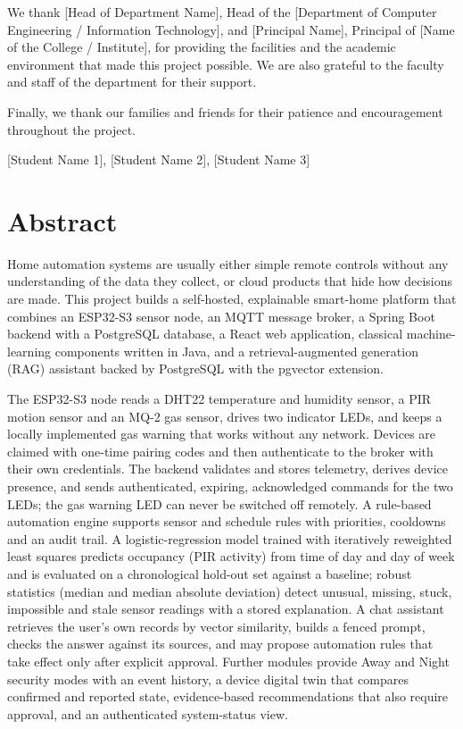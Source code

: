 \documentclass[12pt,a4paper,oneside]{report}
\newcommand{\StudentOne}{[Student Name 1]}
\newcommand{\StudentTwo}{[Student Name 2]}
\newcommand{\StudentThree}{[Student Name 3]}
\newcommand{\HODName}{[Head of Department Name]}
\newcommand{\PrincipalName}{[Principal Name]}
\newcommand{\Department}{[Department of Computer Engineering / Information Technology]}
\newcommand{\College}{[Name of the College / Institute]}
\begin{document}
We thank \HODName, Head of the \Department, and \PrincipalName, Principal of \College, for providing the facilities and the academic environment that made this project possible. We are also grateful to the faculty and staff of the department for their support.

Finally, we thank our families and friends for their patience and encouragement throughout the project.

\vspace{1.2cm}
\hfill \StudentOne, \StudentTwo, \StudentThree

\chapter*{Abstract}
Home automation systems are usually either simple remote controls without any understanding of the data they collect, or cloud products that hide how decisions are made. This project builds a self-hosted, explainable smart-home platform that combines an ESP32-S3 sensor node, an MQTT message broker, a Spring Boot backend with a PostgreSQL database, a React web application, classical machine-learning components written in Java, and a retrieval-augmented generation (RAG) assistant backed by PostgreSQL with the pgvector extension.

The ESP32-S3 node reads a DHT22 temperature and humidity sensor, a PIR motion sensor and an MQ-2 gas sensor, drives two indicator LEDs, and keeps a locally implemented gas warning that works without any network. Devices are claimed with one-time pairing codes and then authenticate to the broker with their own credentials. The backend validates and stores telemetry, derives device presence, and sends authenticated, expiring, acknowledged commands for the two LEDs; the gas warning LED can never be switched off remotely. A rule-based automation engine supports sensor and schedule rules with priorities, cooldowns and an audit trail. A logistic-regression model trained with iteratively reweighted least squares predicts occupancy (PIR activity) from time of day and day of week and is evaluated on a chronological hold-out set against a baseline; robust statistics (median and median absolute deviation) detect unusual, missing, stuck, impossible and stale sensor readings with a stored explanation. A chat assistant retrieves the user's own records by vector similarity, builds a fenced prompt, checks the answer against its sources, and may propose automation rules that take effect only after explicit approval. Further modules provide Away and Night security modes with an event history, a device digital twin that compares confirmed and reported state, evidence-based recommendations that also require approval, and an authenticated system-status view.
\end{document}
